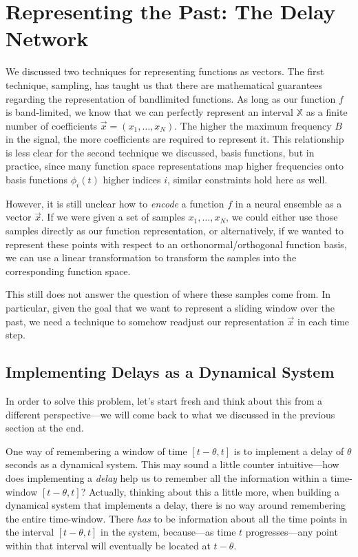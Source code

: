 \documentclass[10pt,letterpaper,oneside]{article}
\begin{document}
\section{Representing the Past: The Delay Network}

We discussed two techniques for representing functions as vectors. The first technique, sampling, has taught us that there are mathematical guarantees regarding the representation of bandlimited functions. As long as our function $f$ is band-limited, we know that we can perfectly represent an interval $\mathbb{X}$ as a finite number of coefficients $\vec x = (x_1, \ldots, x_N)$. The higher the maximum frequency $B$ in the signal, the more coefficients are required to represent it. This relationship is less clear for the second technique we discussed, basis functions, but in practice, since many function space representations map higher frequencies onto basis functions $\phi_i(t)$ higher indices $i$, similar constraints hold here as well.

However, it is still unclear how to \emph{encode} a function $f$ in a neural ensemble as a vector $\vec x$. If we were given a set of samples $x_1, \ldots, x_N$, we could either use those samples directly as our function representation, or alternatively, if we wanted to represent these points with respect to an orthonormal/orthogonal function basis, we can use a linear transformation to transform the samples into the corresponding function space.

This still does not answer the question of where these samples come from. In particular, given the goal that we want to represent a sliding window over the past, we need a technique to somehow readjust our representation $\vec x$ in each time step.

\subsection{Implementing Delays as a Dynamical System}

In order to solve this problem, let's start fresh and think about this from a different perspective---we will come back to what we discussed in the previous section at the end. 

One way of remembering a window of time $[t - \theta, t]$ is to implement a delay of $\theta$ seconds as a dynamical system. This may sound a little counter intuitive---how does implementing a \emph{delay} help us to remember all the information within a time-window $[t - \theta, t]$? Actually, thinking about this a little more, when building a dynamical system that implements a delay, there is no way around remembering the entire time-window. There \emph{has} to be information about all the time points in the interval $[t - \theta, t]$ in the system, because---as time $t$ progresses---any point within that interval will eventually be located at $t - \theta$.
\end{document}
